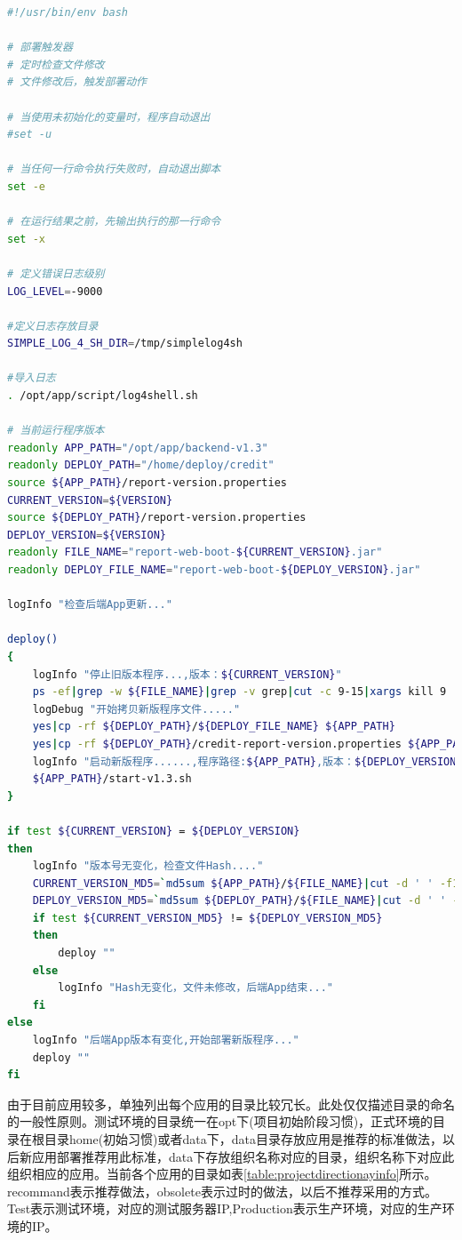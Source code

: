 \documentclass[8pt]{book}
\numberwithin{dummy}{section}
\theoremstyle{ocrenumbox}
\theoremstyle{blacknumex}
\theoremstyle{blacknumbox}
\theoremstyle{ocrenum}
\begin{document}
\begin{lstlisting}[language=Bash]
#!/usr/bin/env bash

# 部署触发器
# 定时检查文件修改
# 文件修改后，触发部署动作

# 当使用未初始化的变量时，程序自动退出
#set -u

# 当任何一行命令执行失败时，自动退出脚本
set -e

# 在运行结果之前，先输出执行的那一行命令
set -x

# 定义错误日志级别
LOG_LEVEL=-9000

#定义日志存放目录
SIMPLE_LOG_4_SH_DIR=/tmp/simplelog4sh

#导入日志
. /opt/app/script/log4shell.sh

# 当前运行程序版本
readonly APP_PATH="/opt/app/backend-v1.3"
readonly DEPLOY_PATH="/home/deploy/credit"
source ${APP_PATH}/report-version.properties
CURRENT_VERSION=${VERSION}
source ${DEPLOY_PATH}/report-version.properties
DEPLOY_VERSION=${VERSION}
readonly FILE_NAME="report-web-boot-${CURRENT_VERSION}.jar"
readonly DEPLOY_FILE_NAME="report-web-boot-${DEPLOY_VERSION}.jar"

logInfo "检查后端App更新..."

deploy()
{
	logInfo "停止旧版本程序...,版本：${CURRENT_VERSION}"
	ps -ef|grep -w ${FILE_NAME}|grep -v grep|cut -c 9-15|xargs kill 9
	logDebug "开始拷贝新版程序文件....."
	yes|cp -rf ${DEPLOY_PATH}/${DEPLOY_FILE_NAME} ${APP_PATH}
	yes|cp -rf ${DEPLOY_PATH}/credit-report-version.properties ${APP_PATH}
	logInfo "启动新版程序......,程序路径:${APP_PATH},版本：${DEPLOY_VERSION}"
	${APP_PATH}/start-v1.3.sh
}

if test ${CURRENT_VERSION} = ${DEPLOY_VERSION}
then
	logInfo "版本号无变化，检查文件Hash...."
	CURRENT_VERSION_MD5=`md5sum ${APP_PATH}/${FILE_NAME}|cut -d ' ' -f1`
	DEPLOY_VERSION_MD5=`md5sum ${DEPLOY_PATH}/${FILE_NAME}|cut -d ' ' -f1`
	if test ${CURRENT_VERSION_MD5} != ${DEPLOY_VERSION_MD5}
	then
		deploy ""
	else
		logInfo "Hash无变化，文件未修改，后端App结束..."
	fi
else
	logInfo "后端App版本有变化,开始部署新版程序..."
	deploy ""
fi
\end{lstlisting}

由于目前应用较多，单独列出每个应用的目录比较冗长。此处仅仅描述目录的命名的一般性原则。测试环境的目录统一在opt下(项目初始阶段习惯)，正式环境的目录在根目录home(初始习惯)或者data下，data目录存放应用是推荐的标准做法，以后新应用部署推荐用此标准，data下存放组织名称对应的目录，组织名称下对应此组织相应的应用。当前各个应用的目录如表\ref{table:projectdirectionayinfo}所示。recommand表示推荐做法，obsolete表示过时的做法，以后不推荐采用的方式。Test表示测试环境，对应的测试服务器IP,Production表示生产环境，对应的生产环境的IP。
\end{document}
